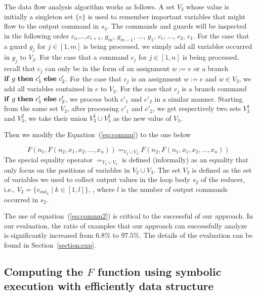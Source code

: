 \documentclass{llncs}
\newcommand{\ite}[3]{
	 \ifmmode 
	 \mathbf{if}\ #1 \ \mathbf{then}\ #2\  \mathbf{else}\ #3 
	 \else
	 \textbf{if}\ #1 \ \textbf{then}\ #2\  \textbf{else}\ #3
	 \fi}
\begin{document}
The data flow analysis algorithm works as follows.
A set $V_3$ whose value is initially a singleton set $\{v\}$ is used to remember important variables that might flow to the output command in $s_3$.
The commands and guards will be inspected in the following order $c_{n}$,$\ldots$,$c_{i+1}$, $g_m$, $g_{m-1}$, $\ldots$, $g_1$, $c_i$, $\ldots$, $c_2$, $c_1$. For the case that a guard $g_j$ for $j\in [1,m]$ is being processed, we simply add all variables occurred in $g_j$ to $V_3$. 
For the case that a command $c_j$ for $j\in [1,n]$ is being processed, 
recall that $c_j$ can only be in the form of an assignment $w:=e$ or a branch $\ite{g}{c'_1}{c'_2}$.
For the case that $c_j$ is an assignment $w:=e$ and $w\in V_3$, we add all variables contained in $e$ to $V_3$. For the case that $c_j$ is a branch command $\ite{g}{c'_1}{c'_2}$, we process both $c'_1$ and $c'_2$ in a similar manner. Starting from the same set $V_3$,  after processing $c'_1$ and $c'_2$, we get respectively two sets $V_3^1$ and $V_3^2$, we take their union $V_3^1\cup V_3^2$ as the new value of $V_3$. 

Then we modify the Equation~(\ref{eq:commu}) to the one below

\begin{equation}
F(n_1, F(n_2,x_1,x_2,\ldots,x_n) )=_{V_2\cup V_3} F(n_2, F(n_1,x_1,x_2,\ldots,x_n) )
\label{eq:commu2}
\end{equation}
The special equality operator $=_{V_2\cup V_3}$ is defined (informally) as an equality that only focus on the positions of variables in $V_2\cup V_3$.
The set $V_2$ is defined as the set of variables we used to collect output values in the loop body $s_2$ of the reducer, i.e., $V_2= \{v_{out_k} \mid k \in [1,l]\}$, , where $l$ is the number of output commands occurred in $s_2$.

The use of equation~(\ref{eq:commu2}) is critical to the successful of our approach. In our evaluation, the ratio of examples that our approach can successfully analyze is significantly increased from $6.8\%$ to $97.5\%$. The details of the evaluation can be found in Section~\ref{section:exp}.

\subsection{Computing the $F$ function using symbolic execution with efficiently data structure}
\label{section:opt2}
\end{document}
